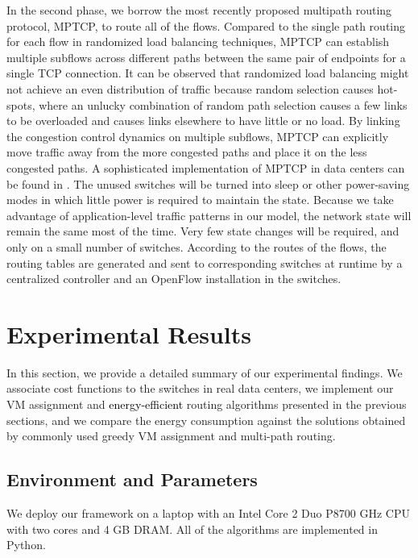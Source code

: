 \documentclass[journal,single-space,two column,twoside,10pt]{IEEEtran}
\begin{document}
In the second phase, we borrow the most recently proposed multipath routing protocol, MPTCP, to route all of the flows. Compared to the single path routing for each flow in randomized load balancing techniques, MPTCP can establish multiple subflows across different paths between the same pair of endpoints for a single TCP connection. It can be observed that randomized load balancing might not achieve an even distribution of traffic because random selection causes hot-spots, where an unlucky combination of random path selection causes a few links to be overloaded and causes links elsewhere to have little or no load. By linking the congestion control dynamics on multiple subflows, MPTCP can explicitly move traffic away from the more congested paths and place it on the less congested paths. A sophisticated implementation of MPTCP in data centers can be found in \cite{Raiciu_Barre-2011}. The unused switches will be turned into sleep or other power-saving modes in which little power is required to maintain the state.
Because we take advantage of application-level traffic patterns in our model, the network state will remain the same most of the time. Very few state changes will be required, and only on a small number of switches. According to the routes of the flows, the routing tables are generated and sent to corresponding switches at runtime by a centralized controller and an OpenFlow installation in the switches.


\section{Experimental Results}
\label{sec:evaluation}

In this section, we provide a detailed summary of our experimental findings. We associate cost functions to the switches in real data centers, we implement our VM assignment and \textcolor{black}{energy-efficient} routing algorithms presented in the previous sections, and we compare the energy consumption against the solutions obtained by commonly used greedy VM assignment and multi-path routing.


\subsection{Environment and Parameters}

We deploy our framework on a laptop with an Intel Core 2 Duo P8700 GHz CPU with two cores and 4 GB DRAM. All of the algorithms are implemented in Python. 
\end{document}
